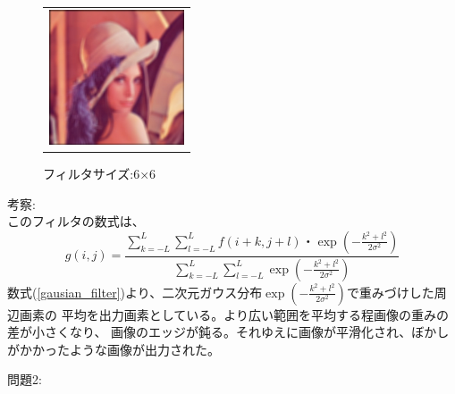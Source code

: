 \documentclass[a4paper,titlepage,11pt]{ltjsarticle}
\begin{document}
\begin{figure}[H]
\begin{center}
\begin{tabular}{c}
\begin{minipage}{0.25\hsize}
\begin{center}
\includegraphics[width=4cm]{gauss_winsize_7.jpg}
\end{center}
\caption*{フィルタサイズ:6×6}
\end{minipage}
\end{tabular}
\end{center}
\end{figure}

考察:\\
このフィルタの数式は、
\begin{equation}
	g(i,j)=\frac{\sum_{k=-L}^{L}\sum_{l=-L}^{L}f(i+k,j+l)・\exp(-\frac{k^{2}+l^{2}}{2\sigma^{2}})}{\sum_{k=-L}^{L}\sum_{l=-L}^{L}\exp(-\frac{k^{2}+l^{2}}{2\sigma^{2}})}
	\label{gausian_filter}
\end{equation}
数式(\ref{gausian_filter})より、二次元ガウス分布$\exp(-\frac{k^{2}+l^{2}}{2\sigma^{2}})$で重みづけした周辺画素の
平均を出力画素としている。より広い範囲を平均する程画像の重みの差が小さくなり、
画像のエッジが鈍る。それゆえに画像が平滑化され、ぼかしがかかったような画像が出力された。

問題2:
\end{document}
